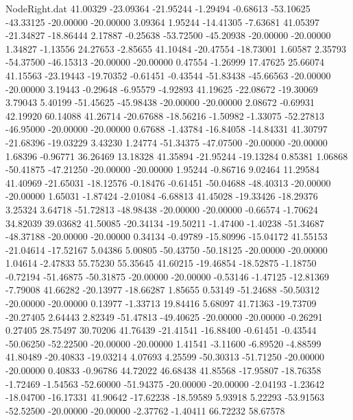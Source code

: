 \begin{filecontents}{NodeRight.dat}
  41.00329  -23.09364  -21.95244    -1.29494   -0.68613  -53.10625  -43.33125  -20.00000  -20.00000    3.09364    1.95244  -14.41305   -7.63681
  41.05397  -21.34827  -18.86444     2.17887   -0.25638  -53.72500  -45.20938  -20.00000  -20.00000    1.34827   -1.13556   24.27653   -2.85655
  41.10484  -20.47554  -18.73001     1.60587    2.35793  -54.37500  -46.15313  -20.00000  -20.00000    0.47554   -1.26999   17.47625   25.66074
  41.15563  -23.19443  -19.70352    -0.61451   -0.43544  -51.83438  -45.66563  -20.00000  -20.00000    3.19443   -0.29648   -6.95579   -4.92893
  41.19625  -22.08672  -19.30069     3.79043    5.40199  -51.45625  -45.98438  -20.00000  -20.00000    2.08672   -0.69931   42.19920   60.14088
  41.26714  -20.67688  -18.56216    -1.50982   -1.33075  -52.27813  -46.95000  -20.00000  -20.00000    0.67688   -1.43784  -16.84058  -14.84331
  41.30797  -21.68396  -19.03229     3.43230    1.24774  -51.34375  -47.07500  -20.00000  -20.00000    1.68396   -0.96771   36.26469   13.18328
  41.35894  -21.95244  -19.13284     0.85381    1.06868  -50.41875  -47.21250  -20.00000  -20.00000    1.95244   -0.86716    9.02464   11.29584
  41.40969  -21.65031  -18.12576    -0.18476   -0.61451  -50.04688  -48.40313  -20.00000  -20.00000    1.65031   -1.87424   -2.01084   -6.68813
  41.45028  -19.33426  -18.29376     3.25324    3.64718  -51.72813  -48.98438  -20.00000  -20.00000   -0.66574   -1.70624   34.82039   39.03682
  41.50085  -20.34134  -19.50211    -1.47400   -1.40238  -51.34687  -48.37188  -20.00000  -20.00000    0.34134   -0.49789  -15.80996  -15.04172
  41.55153  -21.04614  -17.52167     5.04386    5.00805  -50.43750  -50.18125  -20.00000  -20.00000    1.04614   -2.47833   55.75230   55.35645
  41.60215  -19.46854  -18.52875    -1.18750   -0.72194  -51.46875  -50.31875  -20.00000  -20.00000   -0.53146   -1.47125  -12.81369   -7.79008
  41.66282  -20.13977  -18.66287     1.85655    0.53149  -51.24688  -50.50312  -20.00000  -20.00000    0.13977   -1.33713   19.84416    5.68097
  41.71363  -19.73709  -20.27405     2.64443    2.82349  -51.47813  -49.40625  -20.00000  -20.00000   -0.26291    0.27405   28.75497   30.70206
  41.76439  -21.41541  -16.88400    -0.61451   -0.43544  -50.06250  -52.22500  -20.00000  -20.00000    1.41541   -3.11600   -6.89520   -4.88599
  41.80489  -20.40833  -19.03214     4.07693    4.25599  -50.30313  -51.71250  -20.00000  -20.00000    0.40833   -0.96786   44.72022   46.68438
  41.85568  -17.95807  -18.76358    -1.72469   -1.54563  -52.60000  -51.94375  -20.00000  -20.00000   -2.04193   -1.23642  -18.04700  -16.17331
  41.90642  -17.62238  -18.59589     5.93918    5.22293  -53.91563  -52.52500  -20.00000  -20.00000   -2.37762   -1.40411   66.72232   58.67578

\end{filecontents}
